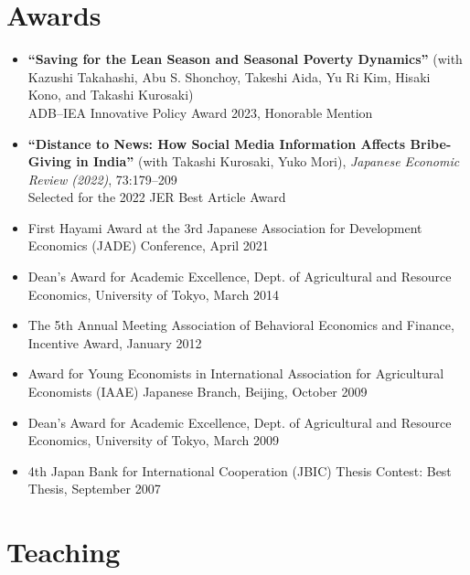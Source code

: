 \documentclass[12pt]{article}
\begin{document}
\section*{Awards}
\begin{itemize}
    \item \textbf{``Saving for the Lean Season and Seasonal Poverty Dynamics''} (with Kazushi Takahashi, Abu S. Shonchoy, Takeshi Aida, Yu Ri Kim, Hisaki Kono, and Takashi Kurosaki) \\
    ADB--IEA Innovative Policy Award 2023, Honorable Mention

    \item \textbf{``Distance to News: How Social Media Information Affects Bribe-Giving in India''} (with Takashi Kurosaki, Yuko Mori), 
    \textit{Japanese Economic Review (2022)}, 73:179--209 \\
    Selected for the 2022 JER Best Article Award

    \item First Hayami Award at the 3rd Japanese Association for Development Economics (JADE) Conference, April 2021

    \item Dean's Award for Academic Excellence, Dept. of Agricultural and Resource Economics, University of Tokyo, March 2014

    \item The 5th Annual Meeting Association of Behavioral Economics and Finance, Incentive Award, January 2012

    \item Award for Young Economists in International Association for Agricultural Economists (IAAE) Japanese Branch, Beijing, October 2009

    \item Dean's Award for Academic Excellence, Dept. of Agricultural and Resource Economics, University of Tokyo, March 2009

    \item 4th Japan Bank for International Cooperation (JBIC) Thesis Contest: Best Thesis, September 2007
\end{itemize}

\section*{Teaching}
\end{document}
